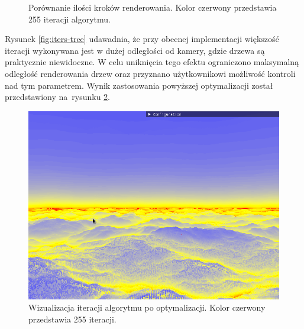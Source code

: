 \begin{figure}[H]
\centering
{}
\caption{Porównanie ilości kroków renderowania. Kolor czerwony przedstawia 255 iteracji algorytmu.}
\label{fig:iters}
\end{figure}

Rysunek \ref{fig:iters-tree} udawadnia, że przy obecnej implementacji większość iteracji wykonywana jest w dużej odległości od kamery, gdzie drzewa są praktycznie niewidoczne. W celu uniknięcia tego efektu ograniczono maksymalną odległość renderowania drzew oraz przyznano użytkownikowi możliwość kontroli nad tym parametrem. Wynik zastosowania powyższej optymalizacji został przedstawiony na~rysunku \ref{fig:iters-opt}.

\begin{figure}[H]
\centering
\includegraphics[width=1\textwidth]{./graf/iterations-trees-opt.png}
\caption{Wizualizacja iteracji algorytmu po optymalizacji. Kolor czerwony przedstawia 255 iteracji.}
\label{fig:iters-opt}
\end{figure}




